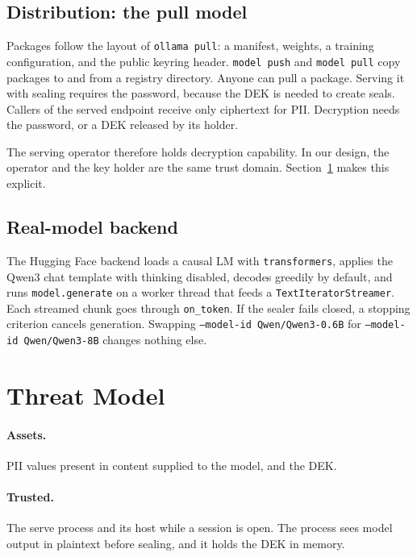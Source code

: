 \documentclass[11pt]{article}
\newcommand{\code}[1]{\texttt{#1}}
\begin{document}
\subsection{Distribution: the pull model}
\label{sec:distribution}

Packages follow the layout of \code{ollama pull}: a manifest, weights, a training configuration, and the public keyring header. \code{model push} and \code{model pull} copy packages to and from a registry directory. Anyone can pull a package. Serving it with sealing requires the password, because the DEK is needed to create seals. Callers of the served endpoint receive only ciphertext for PII. Decryption needs the password, or a DEK released by its holder.

The serving operator therefore holds decryption capability. In our design, the operator and the key holder are the same trust domain. Section~\ref{sec:threat} makes this explicit.

\subsection{Real-model backend}
\label{sec:backend}

The Hugging Face backend loads a causal LM with \code{transformers}, applies the Qwen3 chat template with thinking disabled, decodes greedily by default, and runs \code{model.generate} on a worker thread that feeds a \code{TextIteratorStreamer}. Each streamed chunk goes through \code{on\_token}. If the sealer fails closed, a stopping criterion cancels generation. Swapping \code{--model-id Qwen/Qwen3-0.6B} for \code{--model-id Qwen/Qwen3-8B} changes nothing else.

\section{Threat Model}
\label{sec:threat}

\paragraph{Assets.} PII values present in content supplied to the model, and the DEK.

\paragraph{Trusted.} The serve process and its host while a session is open. The process sees model output in plaintext before sealing, and it holds the DEK in memory.
\end{document}
